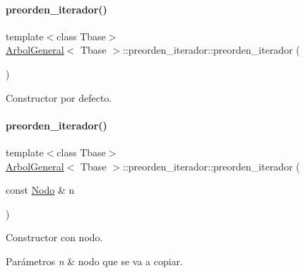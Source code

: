 \paragraph{\texorpdfstring{preorden\+\_\+iterador()}{preorden\_iterador()}\hspace{0.1cm}{\footnotesize\ttfamily [1/3]}}
{\footnotesize\ttfamily template$<$class Tbase$>$ \\
\hyperlink{classArbolGeneral}{Arbol\+General}$<$ Tbase $>$\+::preorden\+\_\+iterador\+::preorden\+\_\+iterador (\begin{DoxyParamCaption}{ }\end{DoxyParamCaption})\hspace{0.3cm}{\ttfamily [inline]}}



Constructor por defecto. 

\hypertarget{classArbolGeneral_1_1preorden__iterador_a3b2071c95cde719c132e53f1a8838bdb}{}\label{classArbolGeneral_1_1preorden__iterador_a3b2071c95cde719c132e53f1a8838bdb} 
\paragraph{\texorpdfstring{preorden\+\_\+iterador()}{preorden\_iterador()}\hspace{0.1cm}{\footnotesize\ttfamily [2/3]}}
{\footnotesize\ttfamily template$<$class Tbase$>$ \\
\hyperlink{classArbolGeneral}{Arbol\+General}$<$ Tbase $>$\+::preorden\+\_\+iterador\+::preorden\+\_\+iterador (\begin{DoxyParamCaption}\item[{const \hyperlink{classArbolGeneral_a12cc1b74a9095d89bc7334290d332f7a}{Nodo} \&}]{n }\end{DoxyParamCaption})\hspace{0.3cm}{\ttfamily [inline]}}



Constructor con nodo. 


\begin{DoxyParams}{Parámetros}
{\em n} & nodo que se va a copiar. \\
\hline
\end{DoxyParams}
\hypertarget{classArbolGeneral_1_1preorden__iterador_a4d412bb22cc8e2aebcb2bbefb0b78a4b}{}\label{classArbolGeneral_1_1preorden__iterador_a4d412bb22cc8e2aebcb2bbefb0b78a4b} 
